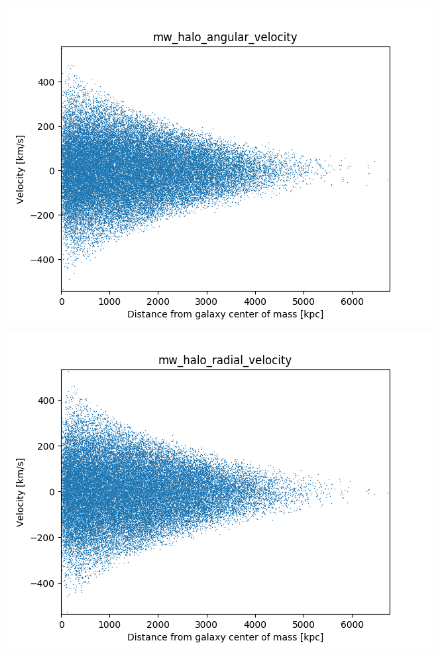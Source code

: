 \documentclass[a4paper,12pt, english]{article}
\begin{document}
\begin{figure}
\centering
\begin{minipage}{0.45\textwidth}
  \centering
\includegraphics[width=1\textwidth]{VelocityDistr/mw_halo_angular_velocity.png}
\end{minipage}
\begin{minipage}{0.45\textwidth}
  \centering
\includegraphics[width=1\textwidth]{VelocityDistr/mw_halo_radial_velocity.png}
\end{minipage}
\begin{minipage}{0.45\textwidth}
  \centering

\end{minipage}
\end{figure}
\end{document}
